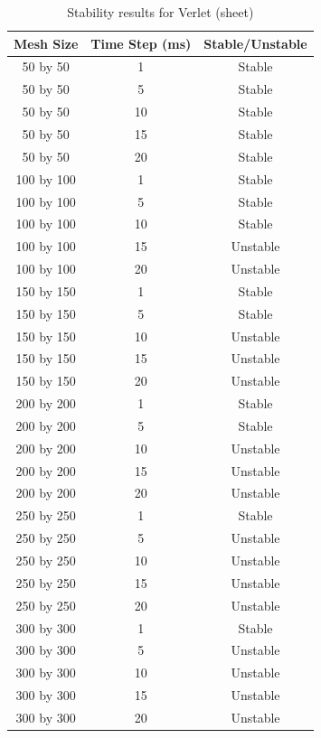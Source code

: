 \begin{table}[tp]
   \begin{minipage}{\textwidth}
      \begin{center}
         \begin{tabular}{|c|c|c|} \hline
           Mesh Size & Time Step (ms) & Stable/Unstable\\
           \hline
           50 by 50 & 1 & Stable\\ \hline
           50 by 50 & 5 & Stable\\ \hline
           50 by 50 & 10 & Stable\\ \hline
           50 by 50 & 15 & Stable\\ \hline
           50 by 50 & 20 & Stable\\ \hline
           100 by 100 & 1 & Stable\\ \hline
           100 by 100 & 5 & Stable\\ \hline
           100 by 100 & 10 & Stable\\ \hline
           100 by 100 & 15 & Unstable\\ \hline
           100 by 100 & 20 & Unstable\\ \hline           
           150 by 150 & 1 & Stable\\ \hline
           150 by 150 & 5 & Stable\\ \hline
           150 by 150 & 10 & Unstable\\ \hline
           150 by 150 & 15 & Unstable\\ \hline
           150 by 150 & 20 & Unstable\\ \hline           
           200 by 200 & 1 & Stable\\ \hline
           200 by 200 & 5 & Stable\\ \hline
           200 by 200 & 10 & Unstable\\ \hline
           200 by 200 & 15 & Unstable\\ \hline
           200 by 200 & 20 & Unstable\\ \hline           
           250 by 250 & 1 & Stable\\ \hline
           250 by 250 & 5 & Unstable\\ \hline
           250 by 250 & 10 & Unstable\\ \hline
           250 by 250 & 15 & Unstable\\ \hline
           250 by 250 & 20 & Unstable\\ \hline           
           300 by 300 & 1 & Stable\\ \hline
           300 by 300 & 5 & Unstable\\ \hline
           300 by 300 & 10 & Unstable\\ \hline
           300 by 300 & 15 & Unstable\\ \hline
           300 by 300 & 20 & Unstable\\ \hline
         \end{tabular}
      \end{center}
   \end{minipage}
   \caption{Stability results for Verlet (sheet)}
   \label{tab:v stability sheet}
\end{table}

